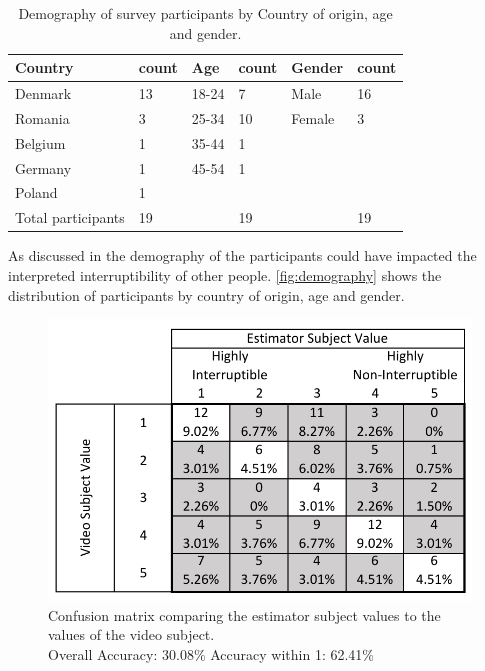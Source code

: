 \documentclass{sigchi}
\begin{document}
\begin{table}[h]
  \centering
    \begin{tabular}{@{}llllll@{}}
    \toprule
    \textbf{Country}        & count & \textbf{Age} & count & \textbf{Gender} & count \\ \midrule
    Denmark                 & 13    & 18-24        & 7     & Male            & 16    \\
    Romania                 & 3     & 25-34        & 10    & Female          & 3     \\
    Belgium                 & 1     & 35-44        & 1     &                 &       \\
    Germany                 & 1     & 45-54        & 1     &                 &       \\
    Poland                  & 1     &              &       &                 &       \\
    Total participants      & 19    &              & 19    &                 & 19    \\ \bottomrule
    \end{tabular}
    \caption{Demography of survey participants by Country of origin, age and gender.}
    \label{fig:demography}
\end{table}

As discussed in  the demography of the participants could have impacted the interpreted interruptibility of other people.
\autoref{fig:demography} shows the distribution of participants by country of origin, age and gender.

\begin{figure}[h]
  \centering
  \includegraphics[width=\columnwidth]{figures/VideoToEstimatorConfusionMatrix.pdf}
  \caption{Confusion matrix comparing the estimator subject values to the values of the video subject. \\Overall Accuracy: 30.08\% Accuracy within 1: 62.41\%}
  \label{fig:video_to_estimator_matrix}
\end{figure}
\end{document}
